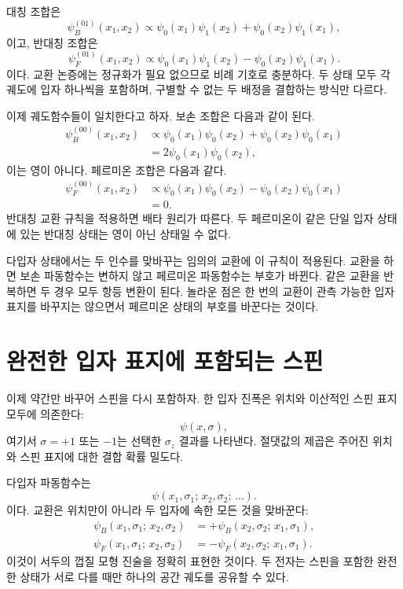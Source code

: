 대칭 조합은
\begin{equation}
\psi_B^{(01)}(x_1,x_2)
\propto
\psi_0(x_1)\psi_1(x_2)
+
\psi_0(x_2)\psi_1(x_1),
\end{equation}
이고, 반대칭 조합은
\begin{equation}
\psi_F^{(01)}(x_1,x_2)
\propto
\psi_0(x_1)\psi_1(x_2)
-
\psi_0(x_2)\psi_1(x_1).
\end{equation}
이다. 교환 논증에는 정규화가 필요 없으므로 비례 기호로 충분하다. 두 상태 모두 각 궤도에 입자 하나씩을 포함하며, 구별할 수 없는 두 배정을 결합하는 방식만 다르다.

이제 궤도함수들이 일치한다고 하자. 보손 조합은 다음과 같이 된다.
\begin{align}
\psi_B^{(00)}(x_1,x_2)
&\propto
\psi_0(x_1)\psi_0(x_2)
+
\psi_0(x_2)\psi_0(x_1)\\
&=
2\psi_0(x_1)\psi_0(x_2),
\end{align}
이는 영이 아니다. 페르미온 조합은 다음과 같다.
\begin{align}
\psi_F^{(00)}(x_1,x_2)
&\propto
\psi_0(x_1)\psi_0(x_2)
-
\psi_0(x_2)\psi_0(x_1)\\
&=0.
\end{align}
반대칭 교환 규칙을 적용하면 배타 원리가 따른다. 두 페르미온이 같은 단일 입자 상태에 있는 반대칭 상태는 영이 아닌 상태일 수 없다.

다입자 상태에서는 두 인수를 맞바꾸는 임의의 교환에 이 규칙이 적용된다. 교환을 하면 보손 파동함수는 변하지 않고 페르미온 파동함수는 부호가 바뀐다. 같은 교환을 반복하면 두 경우 모두 항등 변환이 된다. 놀라운 점은 한 번의 교환이 관측 가능한 입자 표지를 바꾸지는 않으면서 페르미온 상태의 부호를 바꾼다는 것이다.

\section{완전한 입자 표지에 포함되는 스핀}

이제 약간만 바꾸어 스핀을 다시 포함하자. 한 입자 진폭은 위치와 이산적인 스핀 표지 모두에 의존한다:
\begin{equation}
\psi(x,\sigma),
\end{equation}
여기서 \(\sigma=+1\) 또는 \(-1\)는 선택한 \(\sigma_z\) 결과를 나타낸다. 절댓값의 제곱은 주어진 위치와 스핀 표지에 대한 결합 확률 밀도다.

다입자 파동함수는
\begin{equation}
\psi(x_1,\sigma_1;\,x_2,\sigma_2;\,\ldots).
\end{equation}
이다. 교환은 위치만이 아니라 두 입자에 속한 모든 것을 맞바꾼다:
\begin{align}
\psi_B(x_1,\sigma_1;\,x_2,\sigma_2)
&=
+\psi_B(x_2,\sigma_2;\,x_1,\sigma_1),\\
\psi_F(x_1,\sigma_1;\,x_2,\sigma_2)
&=
-\psi_F(x_2,\sigma_2;\,x_1,\sigma_1).
\end{align}
이것이 서두의 껍질 모형 진술을 정확히 표현한 것이다. 두 전자는 스핀을 포함한 완전한 상태가 서로 다를 때만 하나의 공간 궤도를 공유할 수 있다.

